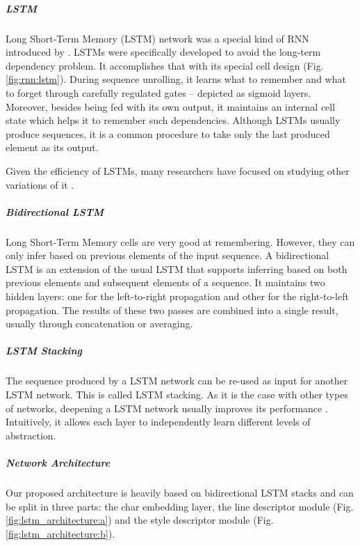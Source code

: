 \subparagraph*{LSTM} 
Long Short-Term Memory (LSTM) network was a special kind of RNN introduced by . LSTMs were specifically developed to avoid the long-term dependency problem. It accomplishes that with its special cell design (Fig. \ref{fig:rnn:lstm}). During sequence unrolling, it learns what to remember and what to forget through carefully regulated gates -- depicted as sigmoid layers. Moreover, besides being fed with its own output, it maintains an internal cell state which helps it to remember such dependencies. Although LSTMs usually produce sequences, it is a common procedure to take only the last produced element as its output.

Given the efficiency of LSTMs, many researchers have focused on studying other variations of it \cite{lstm_odyssey}.

\subparagraph*{Bidirectional LSTM} Long Short-Term Memory cells are very good at remembering. However, they can only infer based on previous elements of the input sequence. A bidirectional LSTM \cite{bi_lstm} is an extension of the usual LSTM that supports inferring based on both previous elements and subsequent elements of a sequence. It maintains two hidden layers: one for the left-to-right propagation and other for the right-to-left propagation. The results of these two passes are combined into a single result, usually through concatenation or averaging.

\subparagraph*{LSTM Stacking} The sequence produced by a LSTM network can be re-used as input for another LSTM network. This is called LSTM stacking. As it is the case with other types of networks, deepening a LSTM network usually improves its performance \cite{deep_lstm}. Intuitively, it allows each layer to independently learn different levels of abstraction.

\subparagraph*{Network Architecture}

Our proposed architecture is heavily based on bidirectional LSTM stacks and can be split in three parts: the char embedding layer, the line descriptor module (Fig. \ref{fig:lstm_architecture:a}) and the style descriptor module (Fig. \ref{fig:lstm_architecture:b}).

